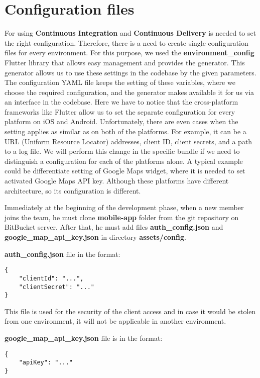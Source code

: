 \section{Configuration files}\label{sec:configuration-files}

For using \textbf{Continuous Integration} and \textbf{Continuous Delivery} is needed to set the right configuration.
Therefore, there is a need to create single configuration files for every environment.
For this purpose, we used the \textbf{environment\_config} Flutter library that allows easy management and provides the generator.
This generator allows us to use these settings in the codebase by the given parameters.
The configuration YAML file keeps the setting of these variables, where we choose the required configuration, and the generator makes available it for us via an interface in the codebase.
Here we have to notice that the cross-platform frameworks like Flutter allow us to set the separate configuration for every platform on iOS and Android.
Unfortunately, there are even cases when the setting applies as similar as on both of the platforms.
For example, it can be a URL (Uniform Resource Locator) addresses, client ID, client secrets, and a path to a log file.
We will perform this change in the specific bundle if we need to distinguish a configuration for each of the platforms alone.
A typical example could be differentiate setting of Google Maps widget, where it is needed to set activated Google Maps API key.
Although these platforms have different architecture, so its configuration is different.

Immediately at the beginning of the development phase, when a new member joins the team, he must clone \textbf{mobile-app} folder from the git repository on BitBucket server.
After that, he must add files \textbf{auth\_config.json} and \textbf{google\_map\_api\_key.json} in directory \textbf{assets/config}.

\textbf{auth\_config.json} file in the format:
\begin{verbatim}
{
    "clientId": "...",
    "clientSecret": "..."
}
\end{verbatim}


This file is used for the security of the client access and in case it would be stolen from one environment, it will not be applicable in another environment.

\textbf{google\_map\_api\_key.json} file is in the format:
\begin{verbatim}
{
    "apiKey": "..."
}
\end{verbatim}

